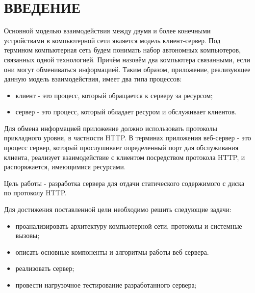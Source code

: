 \chapter*{ВВЕДЕНИЕ}
Основной моделью взаимодействия между двумя и более конечными устройствами в компьютерной сети 
является модель клиент-сервер.
Под термином компьютерная сеть будем понимать набор автономных компьютеров, связанных одной технологией. 
Причём назовём два компьютера связанными, если они могут обмениваться информацией.\cite{tanen_book} 
Таким образом, приложение, реализующее данную модель взаимодействия, 
имеет два типа процессов: 
\begin{itemize}
	\item клиент - это процесс, который обращается к серверу за ресурсом;
	\item сервер - это процесс, который обладает ресуром и обслуживает клиентов.
\end{itemize}
Для обмена информацией приложение должно использовать 
протоколы прикладного уровня, в частности HTTP.
В терминах приложения веб-сервер - это процесс сервер, 
который прослушивает определенный порт для обслуживания клиента,
реализует взаимодействие с клиентом посредством протокола HTTP, и распоряжается, имеющимися ресурсами.
\par
Цель работы - разработка сервера для отдачи статического содержимого с диска по протоколу HTTP.
\par
Для достижения поставленной цели необходимо решить следующие задачи:
\begin{itemize}
	\item проанализировать архитектуру компьютерной сети, протоколы и системные вызовы; 
	\item описать основные компоненты и алгоритмы работы веб-сервера.
	\item реализовать сервер;
	\item провести нагрузочное тестирование разработанного сервера;
\end{itemize}

